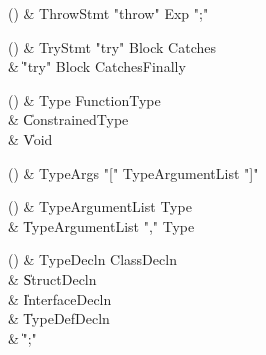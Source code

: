 \begin{bbgrammarappendix}{4.1in}

() & ThrowStmt \label{prod:ThrowStmt}  \: \xcd"throw" Exp \xcd";"  \\


\end{bbgrammarappendix}

\begin{bbgrammarappendix}{4.3in}

() & TryStmt \label{prod:TryStmt}  \: \xcd"try" Block Catches  \\

 &    \| \xcd"try" Block Catches\opt Finally \\

\end{bbgrammarappendix}

\begin{bbgrammarappendix}{4.6in}

() & Type \label{prod:Type}  \: FunctionType  \\

 &    \| ConstrainedType \\
 &    \| Void \\

\end{bbgrammarappendix}

\begin{bbgrammarappendix}{4.2in}

() & TypeArgs \label{prod:TypeArgs}  \: \xcd"[" TypeArgumentList \xcd"]"  \\


\end{bbgrammarappendix}

\begin{bbgrammarappendix}{3.4in}

() & TypeArgumentList \label{prod:TypeArgumentList}  \: Type  \\

 &    \| TypeArgumentList \xcd"," Type \\

\end{bbgrammarappendix}

\begin{bbgrammarappendix}{4.1in}

() & TypeDecln \label{prod:TypeDecln}  \: ClassDecln  \\

 &    \| StructDecln \\
 &    \| InterfaceDecln \\
 &    \| TypeDefDecln \\
 &    \| \xcd";" \\

\end{bbgrammarappendix}

